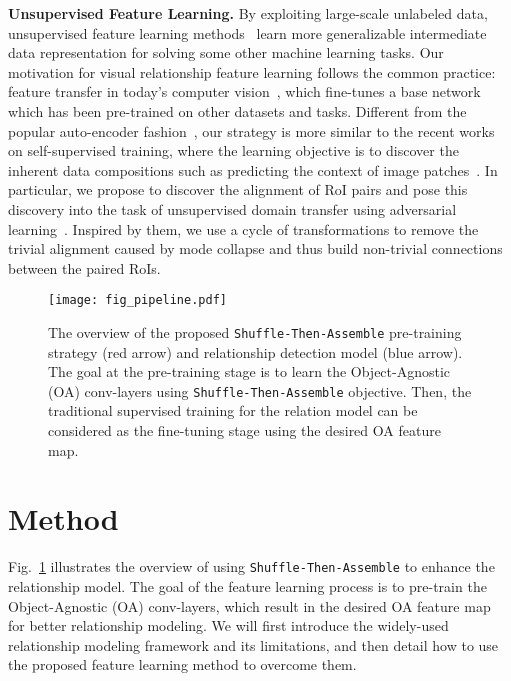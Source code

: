 \documentclass[runningheads]{llncs}
\begin{document}
\noindent\textbf{Unsupervised Feature Learning.}
By exploiting large-scale unlabeled data, unsupervised feature learning methods~\cite{bengio2013representation} learn more generalizable intermediate data representation for solving some other machine learning tasks. Our motivation for visual relationship feature learning follows the common practice: feature transfer in today's computer vision~\cite{yosinski2014transferable}, which fine-tunes a base network which has been pre-trained on other datasets and tasks. Different from the popular auto-encoder fashion~\cite{zhang2017split,donahue2016adversarial}, our strategy is more similar to the recent works on self-supervised training, where the learning objective is to discover the inherent data compositions such as predicting the context of image patches~\cite{doersch2015unsupervised,noroozi2016unsupervised,pathak2016context,ma2017nips,ma2018cvpr,sun2018cvpr}. In particular, we propose to discover the alignment of RoI pairs and pose this discovery into the task of unsupervised domain transfer using adversarial learning~\cite{zhu2017unpaired,kim2017learning,hoffman2017cycada,yi2017dualgan}. Inspired by them, we use a cycle of transformations to remove the trivial alignment caused by mode collapse and thus build non-trivial connections between the paired RoIs.

\begin{figure}[t!]
\centering
\texttt{[image: fig\_pipeline.pdf]}
\caption{The overview of the proposed \texttt{Shuffle-Then-Assemble} pre-training strategy (red arrow) and relationship detection model (blue arrow). The goal at the pre-training stage is to learn the Object-Agnostic (OA) conv-layers using \texttt{Shuffle-Then-Assemble} objective. Then, the traditional supervised training for the relation model can be considered as the fine-tuning stage using the desired OA feature map.
}
\label{fig:2}
\end{figure}
\section{Method}
Fig.~\ref{fig:2} illustrates the overview of using \texttt{Shuffle-Then-Assemble} to enhance the relationship model. The goal of the feature learning process is to pre-train the Object-Agnostic (OA) conv-layers, which result in the desired OA feature map for better relationship modeling. We will first introduce the widely-used relationship modeling framework and its limitations, and then detail how to use the proposed feature learning method to overcome them.
\end{document}

